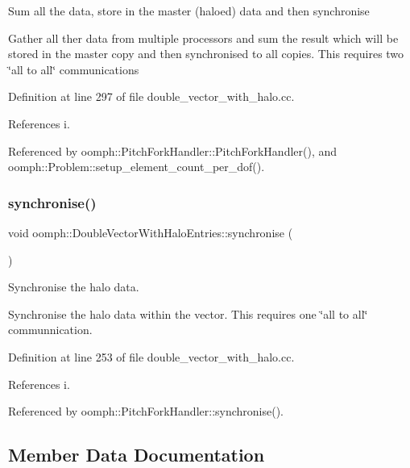 Sum all the data, store in the master (haloed) data and then synchronise

Gather all ther data from multiple processors and sum the result which will be stored in the master copy and then synchronised to all copies. This requires two \char`\"{}all to all\char`\"{} communications 

Definition at line 297 of file double\+\_\+vector\+\_\+with\+\_\+halo.\+cc.



References i.



Referenced by oomph\+::\+Pitch\+Fork\+Handler\+::\+Pitch\+Fork\+Handler(), and oomph\+::\+Problem\+::setup\+\_\+element\+\_\+count\+\_\+per\+\_\+dof().

\mbox{\label{classoomph_1_1DoubleVectorWithHaloEntries_a6d5b6e2c1c80d4fb468c851030d62492}} 
\subsubsection{\texorpdfstring{synchronise()}{synchronise()}}
{\footnotesize\ttfamily void oomph\+::\+Double\+Vector\+With\+Halo\+Entries\+::synchronise (\begin{DoxyParamCaption}{ }\end{DoxyParamCaption})}



Synchronise the halo data. 

Synchronise the halo data within the vector. This requires one \char`\"{}all to all\char`\"{} communnication. 

Definition at line 253 of file double\+\_\+vector\+\_\+with\+\_\+halo.\+cc.



References i.



Referenced by oomph\+::\+Pitch\+Fork\+Handler\+::synchronise().



\subsection{Member Data Documentation}
\mbox{\label{classoomph_1_1DoubleVectorWithHaloEntries_a59c62401e999f683365a34151362e328}} 
